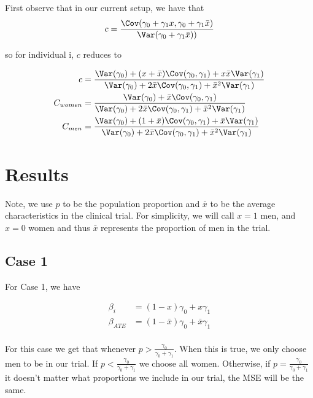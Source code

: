 First observe that in our current setup, we have that
\begin{align*}
	c = \frac{\Cov ( \gamma_0 + \gamma_1 x , \gamma_0  + \gamma_1 \bar{x} )}{ \Var( \gamma_0  + \gamma_1 \bar{x} ))}
\end{align*} 


so for individual i, $c$ reduces to

\begin{align*}
		c &= \frac{\Var(\gamma_0) + (x + \bar{x}) \Cov(\gamma_0, \gamma_1) + x \bar{x} \Var(\gamma_1)}{\Var(\gamma_0) + 2 \bar{x} \Cov(\gamma_0, \gamma_1) + \bar{x}^2\Var(\gamma_1)} \\
		C_{women} &= \frac{\Var(\gamma_0) + \bar{x} \Cov(\gamma_0, \gamma_1)}{\Var(\gamma_0) + 2 \bar{x} \Cov(\gamma_0, \gamma_1) + \bar{x}^2\Var(\gamma_1)} \\
	C_{men} &= \frac{\Var(\gamma_0) + (1 + \bar{x}) \Cov(\gamma_0, \gamma_1) + \bar{x} \Var(\gamma_1)}{\Var(\gamma_0) + 2 \bar{x} \Cov(\gamma_0, \gamma_1) + \bar{x}^2\Var(\gamma_1)} \\
\end{align*} 


\section{Results}


Note, we use $p$ to be the population proportion and $\bar{x}$ to be the average characteristics in the clinical trial. For simplicity, we will call $x = 1$ men, and $x = 0$ women and thus $\bar{x}$ represents the proportion of men in the trial.

\subsection*{Case 1}
For Case 1, we have 

\begin{align*}
	\beta_i &= (1 - x) \gamma_0 + x \gamma_1 \\
	\beta_{ATE} &= (1 - \bar{x}) \gamma_0 + \bar{x} \gamma_1 \\
\end{align*}

For this case we get that whenever $p > \frac{\gamma_0}{ \gamma_0 + \gamma_1}$. When this is true, we only choose men to be in our trial. If $p < \frac{\gamma_0}{ \gamma_0 + \gamma_1}$ we choose all women.
Otherwise, if $p = \frac{\gamma_0}{ \gamma_0 + \gamma_1}$ it doesn't matter what proportions we include in our trial, the MSE will be the same.


